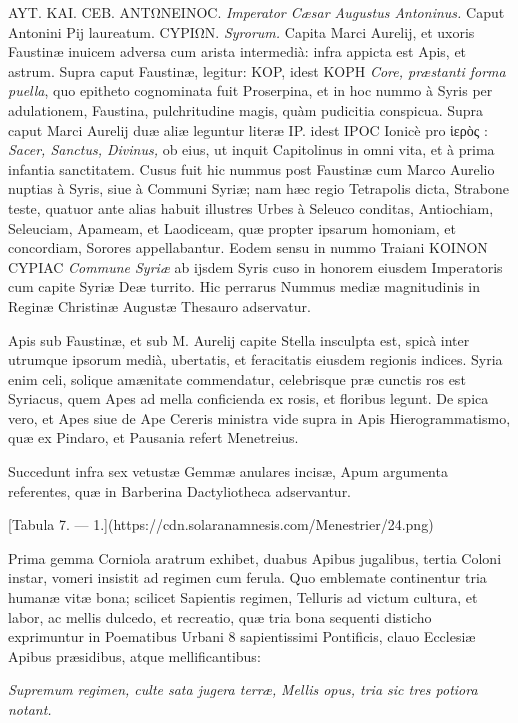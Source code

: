 \documentclass[a4paper, 11pt, oneside, polutonikogreek, latin]{article}
\begin{document}
AYT. KAI. CEB. ANTΩNEINOC. \emph{Imperator Cæsar Augustus Antoninus.} Caput Antonini Pij laureatum. CYPIΩN. \emph{Syrorum.} Capita Marci Aurelij, et uxoris Faustinæ inuicem adversa cum arista intermedià: infra appicta est Apis, et astrum. Supra caput Faustinæ, legitur: KOP, idest KOPH \emph{Core, præstanti forma puella}, quo epitheto cognominata fuit Proserpina, et in hoc nummo à Syris per adulationem, Faustina, pulchritudine magis, quàm pudicitia conspicua. Supra caput Marci Aurelij duæ aliæ leguntur literæ IP. idest IPOC Ionicè pro ἱερὸς : \emph{Sacer, Sanctus, Divinus,} ob eius, ut inquit Capitolinus in omni vita, et à prima infantia sanctitatem. Cusus fuit hic nummus post Faustinæ cum Marco Aurelio nuptias à Syris, siue à Communi Syriæ; nam hæc regio Tetrapolis dicta, Strabone teste, quatuor ante alias habuit illustres Urbes à Seleuco conditas, Antiochiam, Seleuciam, Apameam, et Laodiceam, quæ propter ipsarum homoniam, et concordiam, Sorores appellabantur. Eodem sensu in nummo Traiani KOINON CYPIAC \emph{Commune Syriæ} ab ijsdem Syris cuso in honorem eiusdem Imperatoris cum capite Syriæ Deæ turrito. Hic perrarus Nummus mediæ magnitudinis in Reginæ Christinæ Augustæ Thesauro adservatur.

Apis sub Faustinæ, et sub M. Aurelij capite Stella insculpta est, spicà inter utrumque ipsorum medià, ubertatis, et feracitatis eiusdem regionis indices. Syria enim celi, solique amænitate commendatur, celebrisque præ cunctis ros est Syriacus, quem Apes ad mella conficienda ex rosis, et floribus legunt. De spica vero, et Apes siue de Ape Cereris ministra vide supra in Apis Hierogrammatismo, quæ ex Pindaro, et Pausania refert Menetreius.

Succedunt infra sex vetustæ Gemmæ anulares incisæ, Apum argumenta referentes, quæ in Barberina Dactyliotheca adservantur.

[Tabula 7. --- 1.](https://cdn.solaranamnesis.com/Menestrier/24.png)

Prima gemma Corniola aratrum exhibet, duabus Apibus jugalibus, tertia Coloni instar, vomeri insistit ad regimen cum ferula. Quo emblemate continentur tria humanæ vitæ bona; scilicet Sapientis regimen, Telluris ad victum cultura, et labor, ac mellis dulcedo, et recreatio, quæ tria bona sequenti disticho exprimuntur in Poematibus Urbani 8 sapientissimi Pontificis, clauo Ecclesiæ Apibus præsidibus, atque mellificantibus:

\emph{Supremum regimen, culte sata jugera terræ,}
\emph{Mellis opus, tria sic tres potiora notant.}
\end{document}
